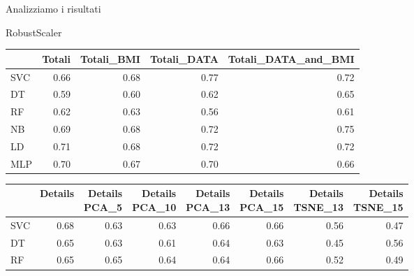 \documentclass{beamer}
\begin{document}
\begin{frame}{Analizziamo i risultati}
	\begin{block}{RobustScaler}
		\begin{center}
			\begin{adjustbox}{max width=\textwidth}
				\begin{tabular}{lrrrr}
					\toprule
					{} &    Totali &  Totali\_BMI &  Totali\_DATA &  Totali\_DATA\_and\_BMI \\
					\midrule
					SVC &  0.66 &         0.68 &          0.77 &                  0.72 \\
					DT  &  0.59 &         0.60 &          0.62 &                  0.65 \\
					RF  &  0.62 &         0.63 &          0.56 &                  0.61 \\
					NB  &  0.69 &         0.68 &          0.72 &                  0.75 \\
					LD  &  0.71 &         0.68 &          0.72 &                  0.72 \\
					MLP &  0.70 &         0.67 &          0.70 &                  0.66 \\
					\bottomrule
				\end{tabular}
			\end{adjustbox}
		\end{center}
		\begin{center}
			\begin{adjustbox}{max width=\textwidth}
				\begin{tabular}{lrrrrrrr}
					\toprule
					{} &   Details &  \thead{Details\\PCA\_5} &  \thead{Details\\PCA\_10} &  \thead{Details\\PCA\_13} &  \thead{Details\\PCA\_15} &  \thead{Details\\TSNE\_13} &  \thead{Details\\TSNE\_15} \\
					\midrule
					SVC &  0.68 &                  0.63 &                   0.63 &                   0.66 &                   0.66 &                    0.56 &                    0.47 \\
					DT  &  0.65 &                  0.63 &                   0.61 &                   0.64 &                   0.63 &                    0.45 &                    0.56 \\
					RF  &  0.65 &                  0.65 &                   0.64 &                   0.64 &                   0.66 &                    0.52 &                    0.49 \\

\end{tabular}
\end{adjustbox}
\end{center}
\end{block}
\end{frame}
\end{document}

